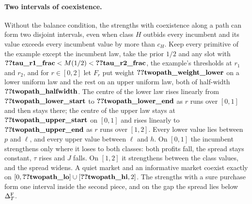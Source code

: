 \paragraph{Two intervals of coexistence.}
Without the balance condition, the strengths with coexistence along a path can form two disjoint intervals, even
when class \(H\) outbids every incumbent and its value exceeds every incumbent value by more than \(c_H\). Keep every
primitive of the example except the incumbent law, take the prior \(1/2\) and any slot with
\(\reg{tau_r1_frac}<M(1/2)<\reg{tau_r2_frac}\), the example's thresholds at \(r_1\) and \(r_2\), and for
\(r\in[0,2]\) let \(F_r\) put weight \(\reg{twopath_weight_lower}\) on a lower uniform law and the rest on an upper
uniform law, both of half-width \(\reg{twopath_halfwidth}\). The centre of the lower law rises linearly from
\(\reg{twopath_lower_start}\) to \(\reg{twopath_lower_end}\) as \(r\) runs over \([0,1]\) and then stays there; the
centre of the upper law stays at \(\reg{twopath_upper_start}\) on \([0,1]\) and rises linearly to
\(\reg{twopath_upper_end}\) as \(r\) runs over \([1,2]\). Every lower value lies between \(p\) and
\(\ell\), and every upper value between \(\ell\) and \(h\). On \([0,1]\) the incumbent strengthens only where it loses
to both classes: both profits fall, the spread stays constant, \(\tau\) rises and \(J\) falls. On \([1,2]\) it
strengthens between the class values, and the spread widens. A quiet market and an informative market coexist exactly
on \([0,\reg{twopath_lo}]\cup[\reg{twopath_hi},2]\). The strengths with a sure purchase form one interval inside the
second piece, and on the gap the spread lies below \(\Delta_T^{\rm F}\).

